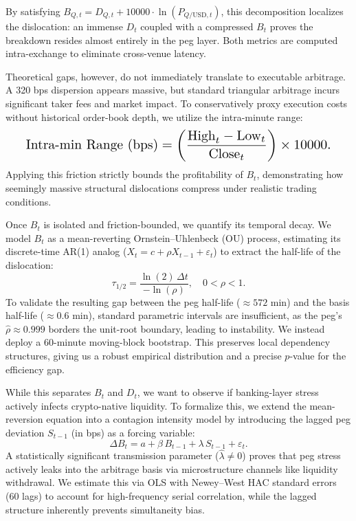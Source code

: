 \documentclass[12pt,twocolumn]{article}
\begin{document}
By satisfying $B_{Q,t}=D_{Q,t}+10000\cdot\ln(P_{Q/\text{USD},t})$, this decomposition localizes the dislocation: an immense $D_t$ coupled with a compressed $B_t$ proves the breakdown resides almost entirely in the peg layer. Both metrics are computed intra-exchange to eliminate cross-venue latency. 

Theoretical gaps, however, do not immediately translate to executable arbitrage. A 320 bps dispersion appears massive, but standard triangular arbitrage incurs significant taker fees and market impact. To conservatively proxy execution costs without historical order-book depth, we utilize the intra-minute range:
\begin{equation}
    \resizebox{0.92\columnwidth}{!}{$\displaystyle
    \text{Intra-min Range (bps)} = \left( \frac{\text{High}_t - \text{Low}_t}{\text{Close}_t} \right)\times 10000.
    $}
\end{equation}
Applying this friction strictly bounds the profitability of $B_t$, demonstrating how seemingly massive structural dislocations compress under realistic trading conditions.

Once $B_t$ is isolated and friction-bounded, we quantify its temporal decay. We model $B_t$ as a mean-reverting Ornstein--Uhlenbeck (OU) process, estimating its discrete-time AR(1) analog ($X_t = c + \rho X_{t-1} + \varepsilon_t$) to extract the half-life of the dislocation:
\begin{equation}
    \tau_{1/2} = \frac{\ln(2)\,\Delta t}{-\ln(\rho)}, \quad 0<\rho<1.
\end{equation}
To validate the resulting gap between the peg half-life (${\approx}572$ min) and the basis half-life (${\approx}0.6$ min), standard parametric intervals are insufficient, as the peg's $\hat\rho \approx 0.999$ borders the unit-root boundary, leading to instability. We instead deploy a 60-minute moving-block bootstrap. This preserves local dependency structures, giving us a robust empirical distribution and a precise $p$-value for the efficiency gap.

While this separates $B_t$ and $D_t$, we want to observe if banking-layer stress actively infects crypto-native liquidity. To formalize this, we extend the mean-reversion equation into a contagion intensity model by introducing the lagged peg deviation $S_{t-1}$ (in bps) as a forcing variable:
\begin{equation}\label{eq:contagion}
    \Delta B_t = a + \beta\, B_{t-1} + \lambda\, S_{t-1} + \varepsilon_t.
\end{equation}
A statistically significant transmission parameter ($\hat\lambda \neq 0$) proves that peg stress actively leaks into the arbitrage basis via microstructure channels like liquidity withdrawal. We estimate this via OLS with Newey--West HAC standard errors (60 lags) to account for high-frequency serial correlation, while the lagged structure inherently prevents simultaneity bias.
\end{document}
